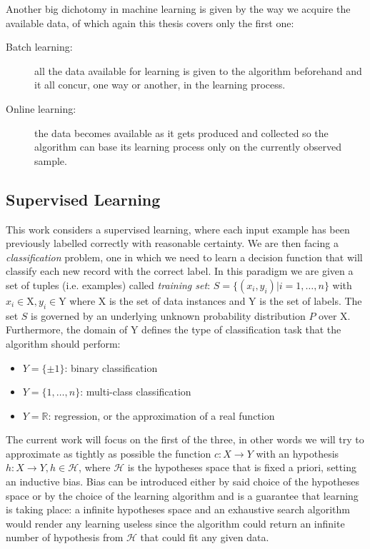Another big dichotomy in machine learning is given by the way we acquire the
available data, of which again this thesis covers only the first one:

\begin{description}
    \item [Batch learning:] all the data available for learning is given to the
        algorithm beforehand and it all concur, one way or another, in the
        learning process.
    \item [Online learning:] the data becomes available as it gets produced
        and collected so the algorithm can base its learning process only
        on the currently observed sample.
\end{description}

\subsection{Supervised Learning}
\label{subsec:sup}

This work considers a supervised learning, where each input example has been
previously labelled correctly with reasonable certainty.
We are then facing a \emph{classification} problem, one in which we need to learn
a decision function that will classify each new record with the correct label.
In this paradigm we are given a set of tuples (i.e. examples) called \emph{training set}:
$S = \{(x_i, y_i)| i=1,\dots,n\}$ with $x_i \in \mathrm{X}, y_i \in \mathrm{Y}$
where $\mathrm{X}$ is the set of data instances and $\mathrm{Y}$ is the set of
labels.
The set $S$ is governed by an underlying unknown probability distribution $P$ over
$\mathrm{X}$.
Furthermore, the domain of $\mathrm{Y}$ defines the type of classification task
that the algorithm should perform:
\begin{itemize}
    \item $Y = \{\pm{1}\}$: binary classification
    \item $Y = \{1,\dots,n\}$: multi-class classification
    \item $Y = \mathbb{R}$: regression, or the approximation of a real function
\end{itemize}

The current work will focus on the first of the three, in other words we will
try to approximate as tightly as possible the function $c:X\to Y$ with an
hypothesis $h:X\to Y, h\in \mathcal{H}$, where $\mathcal{H}$ is the hypotheses
space that is fixed a priori, setting an inductive bias.
Bias can be introduced either by said choice of the hypotheses space or by the
choice of the learning algorithm and is a guarantee that learning is taking place:
a infinite hypotheses space and an exhaustive search algorithm would render
any learning useless since the algorithm could return an infinite number of
hypothesis from $\mathcal{H}$ that could fit any given data.

